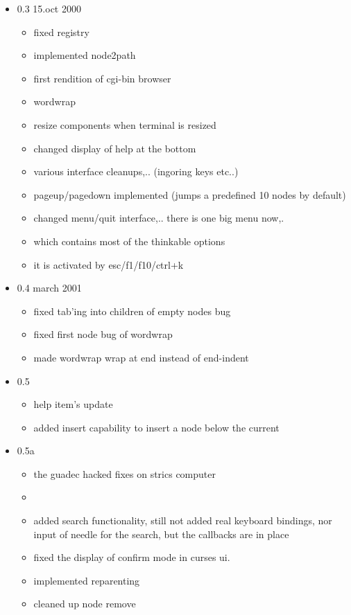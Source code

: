 \documentclass{article}
\begin{document}
\begin{itemize}
\begin{itemize}
		\item 0.3 15.oct 2000
		  \begin{itemize}
			\item fixed registry
			\item implemented node2path
			\item first rendition of cgi-bin browser
			\item wordwrap
			\item resize components when terminal is resized
			\item changed display of help at the bottom
			\item various interface cleanups,.. (ingoring keys etc..)
			\item pageup/pagedown implemented (jumps a predefined 10 nodes by default)
			\item changed menu/quit interface,.. there is one big menu now,.
			\item which contains most of the thinkable options
			\item it is activated by esc/f1/f10/ctrl+k
		  \end{itemize}

		\item 0.4 march 2001
		  \begin{itemize}
			\item fixed tab'ing into children of empty nodes bug
			\item fixed first node bug of wordwrap
			\item made wordwrap wrap at end instead of end-indent
		  \end{itemize}

		\item 0.5
		  \begin{itemize}
			\item help item's update
			\item added insert capability to insert a node below the current
		  \end{itemize}

		\item 0.5a
		  \begin{itemize}
			\item the guadec hacked fixes on strics computer
			\item 
			\item added search functionality, still not added real keyboard bindings, nor input of needle for the search, but the callbacks are in place
			\item fixed the display of confirm mode in curses ui.
			\item implemented reparenting
			\item cleaned up node remove
		  \end{itemize}


\end{itemize}
\end{itemize}
\end{document}
